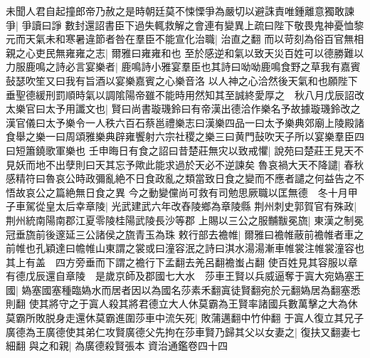 未聞人君自起撞郎帝乃赦之是時朝廷莫不悚慄爭為嚴切以避誅責唯鍾離意獨敢諫爭|{
	爭讀曰諍}
數封還詔書臣下過失輒救解之會連有變異上疏曰陛下敬畏鬼神憂恤黎元而天氣未和寒暑違節者咎在羣臣不能宣化治職|{
	治直之翻}
而以苛刻為俗百官無相親之心吏民無雍雍之志|{
	爾雅曰雍雍和也}
至於感逆和氣以致天災百姓可以德勝難以力服鹿鳴之詩必言宴樂者|{
	鹿鳴詩小雅宴羣臣也其詩曰呦呦鹿鳴食野之草我有嘉賓鼔瑟吹笙又曰我有旨酒以宴樂嘉賓之心樂音洛}
以人神之心洽然後天氣和也願陛下垂聖德緩刑罰順時氣以調隂陽帝雖不能時用然知其至誠終愛厚之　秋八月戊辰詔改太樂官曰太予用讖文也|{
	賢曰尚書璇璣鈴曰有帝漢出德洽作樂名予故據璇璣鈴改之漢官儀曰太予樂令一人秩六百石蔡邕禮樂志曰漢樂四品一曰太予樂典郊廟上陵殿諸食舉之樂一曰周頌雅樂典辟雍饗射六宗社稷之樂三曰黄門鼔吹天子所以宴樂羣臣四曰短簫鐃歌軍樂也}
壬申晦日有食之詔曰昔楚莊無灾以致戒懼|{
	說苑曰楚莊王見天不見妖而地不出孽則曰天其忘予歟此能求過於天必不逆諫矣}
魯哀禍大天不降譴|{
	春秋感精符曰魯哀公時政彌亂絶不日食政亂之類當致日食之變而不應者譴之何益告之不悟故哀公之篇絶無日食之異}
今之動變儻尚可救有司勉思厥職以匡無德　冬十月甲子車駕從皇太后幸章陵|{
	光武建武六年改舂陵鄉為章陵縣}
荆州刺史郭賀官有殊政|{
	荆州統南陽南郡江夏零陵桂陽武陵長沙等郡}
上賜以三公之服黼黻冕旒|{
	東漢之制冕冠垂旒前後邃延三公諸侯之旒青玉為珠}
敕行部去襜帷|{
	爾雅曰襜帷蔽前襜帷者車之前帷也孔穎達曰幨帷山東謂之裳或曰潼容泯之詩曰淇水湯湯漸車帷裳注帷裳潼容也其上有盖　四方旁垂而下謂之襜行下孟翻去羌呂翻襜蚩占翻}
使百姓見其容服以章有德戊辰還自章陵　是歲京師及郡國七大水　莎車王賢以兵威逼奪于寘大宛媯塞王國|{
	媯塞國塞種臨媯水而居者因以為國名莎素禾翻寘徒賢翻宛於元翻媯居為翻塞悉則翻}
使其將守之于寘人殺其將君德立大人休莫霸為王賢率諸國兵數萬擊之大為休莫霸所敗脱身走還休莫霸進圍莎車中流矢死|{
	敗蒲邁翻中竹仲翻}
于寘人復立其兄子廣德為王廣德使其弟仁攻賢廣德父先拘在莎車賢乃歸其父以女妻之|{
	復扶又翻妻七細翻}
與之和親|{
	為廣德殺賢張本}
資治通鑑卷四十四





































